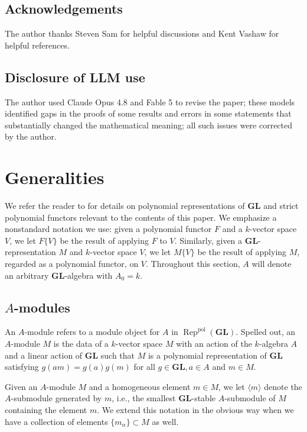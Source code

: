 \documentclass[12pt]{amsart}
\newcommand{\pol}{\mathrm{pol}}
\DeclareMathOperator{\Rep}{Rep}
\newcommand{\GL}{\mathbf{GL}}
\numberwithin{equation}{section}
\theoremstyle{definition}
\theoremstyle{plain}
\begin{document}
\subsection*{Acknowledgements}{The author thanks Steven Sam for helpful discussions and Kent Vashaw for helpful references.}

\subsection*{Disclosure of LLM use}{The author used Claude Opus 4.8 and Fable 5 to revise the paper; these models identified gaps in the proofs of some results and errors in some statements that substantially changed the mathematical meaning; all such issues were corrected by the author.}



\section{Generalities}\label{s:prelim}
We refer the reader to \cite[Section~2]{gan22ext} for details on polynomial representations of $\GL$ and strict polynomial functors relevant to the contents of this paper. We emphasize a nonstandard notation we use: given a polynomial functor $F$ and a $k$-vector space $V$, we let $F\{V\}$ be the result of applying $F$ to $V$. Similarly, given a $\GL$-representation $M$ and $k$-vector space $V$, we let $M\{V\}$ be the result of applying $M$, regarded as a polynomial functor, on $V$. Throughout this section, $A$ will denote an arbitrary $\GL$-algebra with $A_0=k$. 

\subsection{\texorpdfstring{$A$}{A}-modules}\label{ss:modules}
An $A$-module refers to a module object for $A$ in $\Rep^{\pol}(\GL)$. Spelled out, an $A$-module $M$ is the data of a $k$-vector space $M$ with an action of the $k$-algebra $A$ and a linear action of $\GL$ such that $M$ is a polynomial representation of $\GL$ satisfying $g(am) = g(a) g(m)$ for all $g \in \GL, a \in A$ and $m \in M$. 


Given an $A$-module $M$ and a homogeneous element $m \in M$, we let $\langle m \rangle$ denote the $A$-submodule generated by $m$, i.e., the smallest $\GL$-stable $A$-submodule of $M$ containing the element $m$. We extend this notation in the obvious way when we have a collection of elements $\{m_{\alpha}\} \subset M$ as well. 
\end{document}

